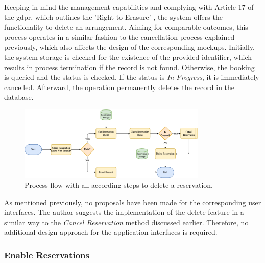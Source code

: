 Keeping in mind the management capabilities and complying with Article 17 of the \acrfull{gdpr}, which outlines the 'Right to Erasure' \cite{noauthor_art_2018}, the system offers the functionality to delete an arrangement.
Aiming for comparable outcomes, this process operates in a similar fashion to the cancellation process explained previously, which also affects the design of the corresponding mockups.
Initially, the system storage is checked for the existence of the provided identifier, which results in process termination if the record is not found. 
Otherwise, the booking is queried and the status is checked. If the status is \textit{In Progress}, it is immediately cancelled. Afterward, the operation permanently deletes the record in the database. 

\begin{figure}[h]
    \centering
    \includegraphics[width=0.8\textwidth,keepaspectratio]{resources/images/main/5_design/processes/ReservationDelete.png}
    \caption{Process flow with all according steps to delete a reservation.}
    \label{fig:delete-reservation-flowchart}
\end{figure}

\noindent As mentioned previously, no proposals have been made for the corresponding user interfaces. The author suggests the implementation of the delete feature in a similar way to the \textit{Cancel Reservation} method discussed earlier.
Therefore, no additional design approach for the application interfaces is required.

\newpage

\subsubsection{Enable Reservations}
\label{ch:Design:sec:Reservation System:ssec:Management Capabilities:sssec:Enable Reservations}

